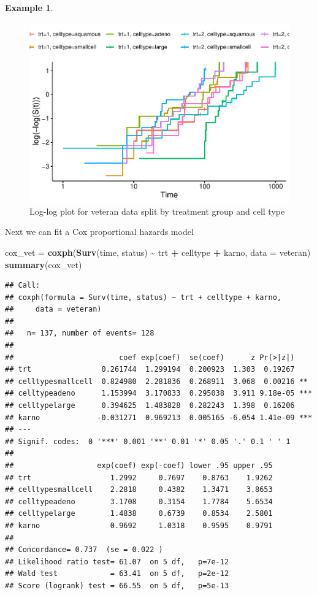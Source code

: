 \documentclass[
  openany]{book}
\newenvironment{Shaded}{\begin{snugshade}}{\end{snugshade}}
\newcommand{\AttributeTok}[1]{\textcolor[rgb]{0.13,0.29,0.53}{#1}}
\newcommand{\FunctionTok}[1]{\textcolor[rgb]{0.13,0.29,0.53}{\textbf{#1}}}
\newcommand{\NormalTok}[1]{#1}
\newcommand{\OtherTok}[1]{\textcolor[rgb]{0.56,0.35,0.01}{#1}}
\newcommand{\SpecialCharTok}[1]{\textcolor[rgb]{0.81,0.36,0.00}{\textbf{#1}}}
\theoremstyle{definition}
\theoremstyle{definition}
\newtheorem{example}{Example}[chapter]
\theoremstyle{definition}
\theoremstyle{definition}
\theoremstyle{remark}
\begin{document}
\begin{example}
\begin{figure}
\centering
\includegraphics{CT4H_notes_files/figure-latex/loglogvet1-1.pdf}
\caption{\label{fig:loglogvet1}Log-log plot for veteran data split by treatment group and cell type}
\end{figure}

Next we can fit a Cox proportional hazards model

\begin{Shaded}
\begin{Highlighting}[]
\NormalTok{cox\_vet }\OtherTok{=} \FunctionTok{coxph}\NormalTok{(}\FunctionTok{Surv}\NormalTok{(time, status) }\SpecialCharTok{\textasciitilde{}}\NormalTok{ trt }\SpecialCharTok{+}\NormalTok{ celltype }\SpecialCharTok{+}\NormalTok{ karno, }\AttributeTok{data =}\NormalTok{ veteran)}
\FunctionTok{summary}\NormalTok{(cox\_vet)}
\end{Highlighting}
\end{Shaded}

\begin{verbatim}
## Call:
## coxph(formula = Surv(time, status) ~ trt + celltype + karno, 
##     data = veteran)
## 
##   n= 137, number of events= 128 
## 
##                        coef exp(coef)  se(coef)      z Pr(>|z|)    
## trt                0.261744  1.299194  0.200923  1.303  0.19267    
## celltypesmallcell  0.824980  2.281836  0.268911  3.068  0.00216 ** 
## celltypeadeno      1.153994  3.170833  0.295038  3.911 9.18e-05 ***
## celltypelarge      0.394625  1.483828  0.282243  1.398  0.16206    
## karno             -0.031271  0.969213  0.005165 -6.054 1.41e-09 ***
## ---
## Signif. codes:  0 '***' 0.001 '**' 0.01 '*' 0.05 '.' 0.1 ' ' 1
## 
##                   exp(coef) exp(-coef) lower .95 upper .95
## trt                  1.2992     0.7697    0.8763    1.9262
## celltypesmallcell    2.2818     0.4382    1.3471    3.8653
## celltypeadeno        3.1708     0.3154    1.7784    5.6534
## celltypelarge        1.4838     0.6739    0.8534    2.5801
## karno                0.9692     1.0318    0.9595    0.9791
## 
## Concordance= 0.737  (se = 0.022 )
## Likelihood ratio test= 61.07  on 5 df,   p=7e-12
## Wald test            = 63.41  on 5 df,   p=2e-12
## Score (logrank) test = 66.55  on 5 df,   p=5e-13
\end{verbatim}


\end{example}
\end{document}
